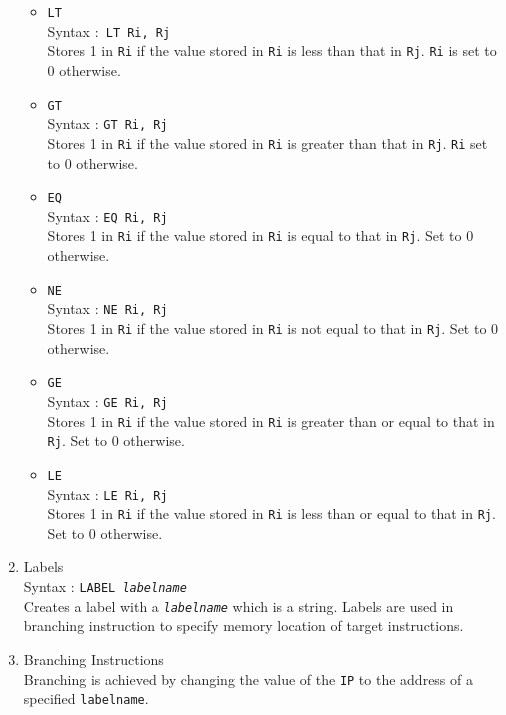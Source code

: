\documentclass[11pt]{report}
\begin{document}
\begin{enumerate}
\begin{itemize}
\item \texttt{LT}\\
Syntax :\texttt{ LT Ri, Rj}\\
Stores 1 in \texttt{Ri} if the value stored in \texttt{Ri} is less than that in \texttt{Rj}. \texttt{Ri} is set to 0 otherwise. 

\item \texttt{GT}\\
Syntax : \texttt{GT Ri, Rj}\\
Stores 1 in \texttt{Ri} if the value stored in \texttt{Ri} is greater than that in \texttt{Rj}. \texttt{Ri} set to 0 otherwise. 

\item \texttt{EQ}\\
Syntax : \texttt{EQ Ri, Rj}\\
Stores 1 in \texttt{Ri} if the value stored in \texttt{Ri} is equal to that in \texttt{Rj}. Set to 0 otherwise. 

\item \texttt{NE}\\
Syntax : \texttt{NE Ri, Rj}\\
Stores 1 in \texttt{Ri} if the value stored in \texttt{Ri} is not equal to that in \texttt{Rj}. Set to 0 otherwise. 

\item \texttt{GE} \\
Syntax : \texttt{GE Ri, Rj} \\
Stores 1 in \texttt{Ri} if the value stored in \texttt{Ri} is greater than or equal to that in \texttt{Rj}. Set to 0 otherwise. 

\item \texttt{LE}\\
Syntax : \texttt{LE Ri, Rj}\\
Stores 1 in \texttt{Ri} if the value stored in \texttt{Ri} is less than or equal to that in \texttt{Rj}. Set to 0 otherwise. 
\end{itemize}

\item Labels \\
Syntax : \texttt{LABEL \textit{labelname}} \\
Creates a label with a \texttt{\textit{labelname}}  which is a string. Labels are used in branching instruction to specify memory location of target instructions.


\item Branching Instructions\\
Branching is achieved by changing the value of the \texttt{IP} to the address of a specified \texttt{labelname}. 
 

\end{enumerate}
\end{document}
